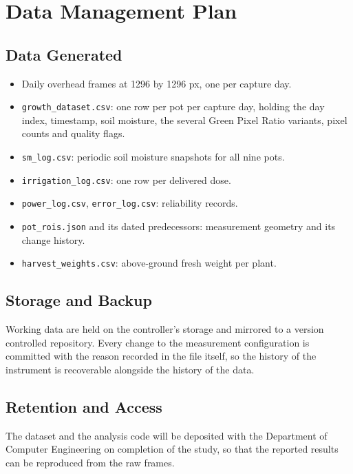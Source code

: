 \section{Data Management Plan}

\subsection{Data Generated}

\begin{itemize}
  \item Daily overhead frames at 1296 by 1296 px, one per capture day.
  \item \texttt{growth\_dataset.csv}: one row per pot per capture day, holding
        the day index, timestamp, soil moisture, the several Green Pixel Ratio
        variants, pixel counts and quality flags.
  \item \texttt{sm\_log.csv}: periodic soil moisture snapshots for all nine
        pots.
  \item \texttt{irrigation\_log.csv}: one row per delivered dose.
  \item \texttt{power\_log.csv}, \texttt{error\_log.csv}: reliability records.
  \item \texttt{pot\_rois.json} and its dated predecessors: measurement
        geometry and its change history.
  \item \texttt{harvest\_weights.csv}: above-ground fresh weight per plant.
\end{itemize}

\subsection{Storage and Backup}

Working data are held on the controller's storage and mirrored to a version
controlled repository. Every change to the measurement configuration is
committed with the reason recorded in the file itself, so the history of the
instrument is recoverable alongside the history of the data.

\subsection{Retention and Access}

The dataset and the analysis code will be deposited with the Department of
Computer Engineering on completion of the study, so that the reported results
can be reproduced from the raw frames.
